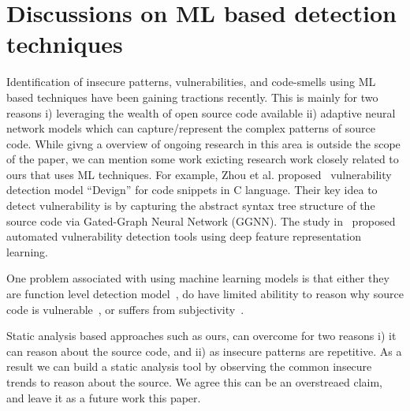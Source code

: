 
\section{Discussions on ML based detection techniques}
Identification of insecure patterns, vulnerabilities, and code-smells using ML based 
techniques have been gaining tractions recently. This is mainly for two reasons 
i) leveraging the wealth of open source code available ii) adaptive neural network models 
which can capture/represent the complex patterns of source code. While givng a overview of ongoing  research in this area is outside
the scope of the paper, we can mention some work exicting research work closely related to ours that uses ML techniques. 
For example, Zhou et al. proposed~\cite{devign_neurips19} vulnerability detection model ``Devign'' for code snippets in C language. Their key idea to detect vulnerability is by capturing the abstract syntax tree structure of the source code via Gated-Graph Neural Network (GGNN).
The study in~\cite{Automated-Vulnerability-Detection-in-Source-Code-Using-Deep-Representation-Learning} proposed automated vulnerability detection tools using deep feature representation learning. 

One problem associated with using machine learning models is that either they are function level detection model~\cite{Automated-Vulnerability-Detection-in-Source-Code-Using-Deep-Representation-Learning}, do have limited abilitity 
to reason why source code is vulnerable~\cite{devign_neurips19}, or suffers from subjectivity~\cite{are-we-there-yet}.


Static analysis based approaches such as ours, can overcome for two reasons i) it can reason about the source code, and ii) as insecure patterns are repetitive. As a result we can build a static analysis tool by observing 
the common insecure trends to reason about the  source. 
We agree this can be an overstreaed claim, and leave it as a future work this paper.  


